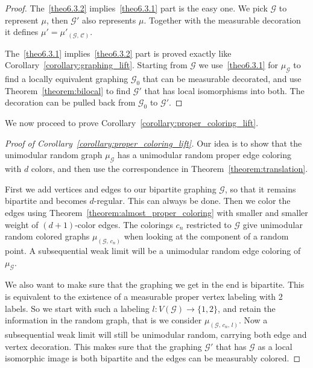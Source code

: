 \documentclass[11pt]{article}
\theoremstyle{definition}
\numberwithin{equation}{section}
\numberwithin{figure}{section}
\numberwithin{table}{section}
\newcommand{\G}{\mathcal{G}}
\newcommand{\clC}{\mathcal{C}}
\begin{document}
\begin{proof}
The~\eqref{theo6.3.2} implies~\eqref{theo6.3.1} part is the easy one. We pick $\G$ to represent $\mu$, then $\G'$ also represents $\mu$. Together with the measurable decoration it defines $\mu'=\mu'_{(\G,\,\clC)}$.

The~\eqref{theo6.3.1} implies~\eqref{theo6.3.2} part is proved exactly like Corollary~\ref{corollary:graphing_lift}. Starting from $\G$ we use~\eqref{theo6.3.1} for $\mu_{\G}$ to find a locally equivalent graphing $\G_0$ that can be measurable decorated, and use Theorem~\ref{theorem:bilocal} to find $\G'$ that has local isomorphisms into both. The decoration can be pulled back from $\G_0$ to $\G'$.
\end{proof}


We now proceed to prove Corollary~\ref{corollary:proper_coloring_lift}.


\begin{proof}[Proof of Corollary~\ref{corollary:proper_coloring_lift}]
Our idea is to show that the unimodular random graph $\mu_{\G}$ has a unimodular random proper edge coloring with $d$ colors, and then use the correspondence in Theorem~\ref{theorem:translation}.

First we add vertices and edges to our bipartite graphing $\G$, so that it remains bipartite and becomes $d$-regular. This can always be done. Then we color the edges using Theorem~\ref{theorem:almost_proper_coloring} with smaller and smaller weight of $(d+1)$-color edges. The colorings $c_n$ restricted to $\G$ give unimodular random colored graphs $\mu_{(\G,\,c_n)}$ when looking at the component of a random point. A subsequential weak limit will be a unimodular random edge coloring of $\mu_{\G}$.

We also want to make sure that the graphing we get in the end is bipartite. This is equivalent to the existence of a measurable proper vertex labeling with 2 labels. So we start with such a labeling $l: V(\G) \to \{1,2\}$, and retain the information in the random graph, that is we consider $\mu_{(\G,\,c_n,\,l)}$. Now a subsequential weak limit will still be unimodular random, carrying both edge and vertex decoration. This makes sure that the graphing $\G'$ that has $\G$ as a local isomorphic image is both bipartite and the edges can be measurably colored.
\end{proof}
\end{document}
